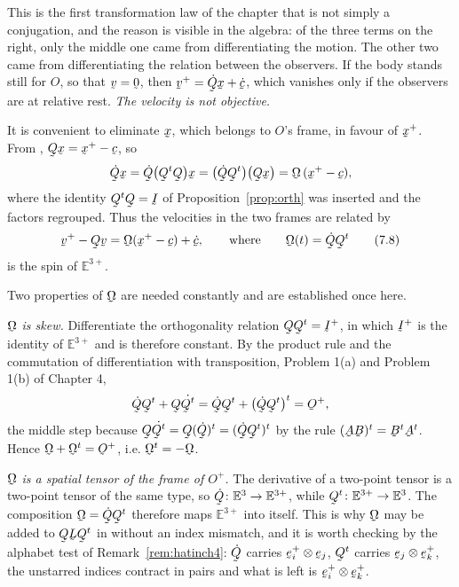 This is the first transformation law of the chapter that is not simply a
conjugation, and the reason is visible in the algebra: of the three terms
on the right, only the middle one came from differentiating the motion.
The other two came from differentiating the relation between the
observers. If the body stands still for $O$, so that $\bv=\bze$, then
$\bv^{+}=\dot\bQ\bx+\dot\bc$, which vanishes only if the observers are at
relative rest. \emph{The velocity is not objective.}

It is convenient to eliminate $\bx$, which belongs to $O$'s frame, in
favour of $\bx^{+}$. From , $\bQ\bx=\bx^{+}-\bc$, so
\[
   \dot\bQ\bx=\dot\bQ\big(\bQ^{t}\bQ\big)\bx
   =\big(\dot\bQ\bQ^{t}\big)\big(\bQ\bx\big)
   =\bOm\,(\bx^{+}-\bc),
\]
where the identity $\bQ^{t}\bQ=\I$ of Proposition~\ref{prop:orth} was
inserted and the factors regrouped. Thus the velocities in the two frames
are related by
\begin{equation}
   \bv^{+}-\bQ\bv=\bOm(\bx^{+}-\bc)+\dot\bc ,
   \qquad\text{where}\qquad
   \bOm(t)=\dot\bQ\bQ^{t}
   \tag{7.8}\label{eq:7.8}
\end{equation}
is the spin of $\mathbb{E}^{3+}$.

Two properties of $\bOm$ are needed constantly and are established once
here.

\emph{$\bOm$ is skew.} Differentiate the orthogonality relation
$\bQ\bQ^{t}=\I^{+}$, in which $\I^{+}$ is the identity of
$\mathbb{E}^{3+}$ and is therefore constant. By the product rule and the
commutation of differentiation with transposition, Problem 1(a) and
Problem 1(b) of Chapter 4,
\[
   \dot\bQ\bQ^{t}+\bQ\dot{\bQ^{t}}
   =\dot\bQ\bQ^{t}+\big(\dot\bQ\bQ^{t}\big)^{t}
   =\Ob^{+},
\]
the middle step because $\bQ\dot{\bQ^{t}}=\bQ(\dot\bQ)^{t}
=(\dot\bQ\bQ^{t})^{t}$ by the rule $(\bA\bB)^{t}=\bB^{t}\bA^{t}$. Hence
$\bOm+\bOm^{t}=\Ob^{+}$, i.e. $\bOm^{t}=-\bOm$.

\emph{$\bOm$ is a spatial tensor of the frame of $O^{+}$.} The derivative
of a two-point tensor is a two-point tensor of the same type, so
$\dot\bQ\colon\Et\to\mathbb{E}^{3+}$, while
$\bQ^{t}\colon\mathbb{E}^{3+}\to\Et$. The composition
$\bOm=\dot\bQ\bQ^{t}$ therefore maps $\mathbb{E}^{3+}$ into itself. This
is why $\bOm$ may be added to $\bQ\bL\bQ^{t}$ in  without an
index mismatch, and it is worth checking by the alphabet test of
Remark~\ref{rem:hatinch4}: $\dot\bQ$ carries
$\be^{+}_{i}\otimes\be_{j}$, $\bQ^{t}$ carries
$\be_{j}\otimes\be^{+}_{k}$, the unstarred indices contract in pairs and
what is left is $\be^{+}_{i}\otimes\be^{+}_{k}$.


